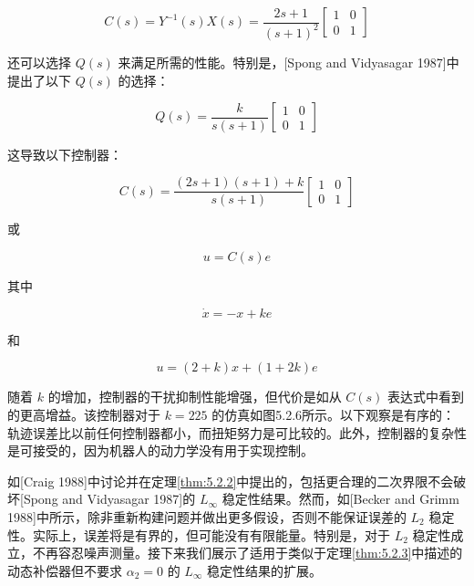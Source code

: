 \documentclass[UTF8,12pt,a4paper]{ctexart}
\begin{document}
\begin{example}
\begin{equation}
C(s) = Y^{-1}(s)X(s) = \frac{2s+1}{(s+1)^2}\begin{bmatrix} 1 & 0 \\ 0 & 1 \end{bmatrix}
\end{equation}

还可以选择 $Q(s)$ 来满足所需的性能。特别是，[Spong and Vidyasagar 1987]中提出了以下 $Q(s)$ 的选择：

\begin{equation}
Q(s) = \frac{k}{s(s+1)}\begin{bmatrix} 1 & 0 \\ 0 & 1 \end{bmatrix}
\end{equation}

这导致以下控制器：

\begin{equation}
C(s) = \frac{(2s+1)(s+1) + k}{s(s+1)}\begin{bmatrix} 1 & 0 \\ 0 & 1 \end{bmatrix}
\end{equation}

或

\begin{equation}
u = C(s)e
\end{equation}

其中

\begin{equation}
\dot{x} = -x + ke
\end{equation}

和

\begin{equation}
u = (2 + k)x + (1 + 2k)e
\end{equation}

随着 $k$ 的增加，控制器的干扰抑制性能增强，但代价是如从 $C(s)$ 表达式中看到的更高增益。该控制器对于 $k = 225$ 的仿真如图5.2.6所示。以下观察是有序的：轨迹误差比以前任何控制器都小，而扭矩努力是可比较的。此外，控制器的复杂性是可接受的，因为机器人的动力学没有用于实现控制。
\end{example}

如[Craig 1988]中讨论并在定理\ref{thm:5.2.2}中提出的，包括更合理的二次界限不会破坏[Spong and Vidyasagar 1987]的 $L_\infty$ 稳定性结果。然而，如[Becker and Grimm 1988]中所示，除非重新构建问题并做出更多假设，否则不能保证误差的 $L_2$ 稳定性。实际上，误差将是有界的，但可能没有有限能量。特别是，对于 $L_2$ 稳定性成立，不再容忍噪声测量。接下来我们展示了适用于类似于定理\ref{thm:5.2.3}中描述的动态补偿器但不要求 $\alpha_2 = 0$ 的 $L_\infty$ 稳定性结果的扩展。
\end{document}
